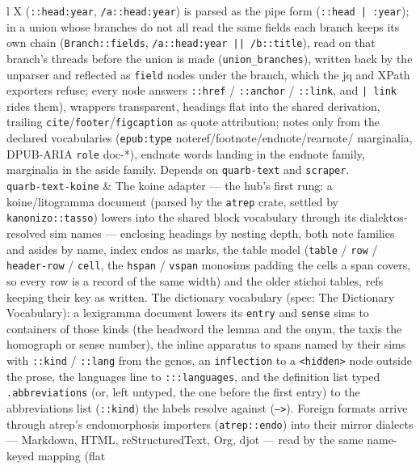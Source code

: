 \documentclass{report}
\begin{document}
\begin{xltabular}{\textwidth}{l X}
  (\texttt{::head:year}, \texttt{/a::head:year}) is parsed as the
  pipe form (\texttt{::head | :year}); in a union whose branches
  do not all read the same fields each branch keeps its own chain
  (\texttt{Branch::fields}, \texttt{/a::head:year || /b::title}),
  read on that branch's threads before the union is made
  (\texttt{union\_branches}), written back by the unparser and
  reflected as \texttt{field} nodes under the branch, which the jq
  and XPath exporters refuse;
  every node answers \texttt{::href} / \texttt{::anchor} /
  \texttt{::link}, and \texttt{| link} rides them),
  wrappers transparent, headings flat into the shared derivation, trailing
  \texttt{cite}/\texttt{footer}/\texttt{figcaption} as quote
  attribution; notes only from the declared vocabularies
  (\texttt{epub:type} noteref/footnote/endnote/rearnote/%
  marginalia, DPUB-ARIA \texttt{role} doc-*), endnote words
  landing in the endnote family, marginalia in the aside
  family. Depends on \texttt{quarb-text} and
  \texttt{scraper}. \\
\texttt{quarb-text-koine} & The koine adapter — the hub's
  first rung: a koine/litogramma document (parsed by the
  \texttt{atrep} crate, settled by \texttt{kanonizo::tasso})
  lowers into the shared block vocabulary through its
  dialektos-resolved sim names — enclosing headings by nesting
  depth, both note families and asides by name, index endos as
  marks, the table model (\texttt{table} / \texttt{row} /
  \texttt{header-row} / \texttt{cell}, the \texttt{hspan} /
  \texttt{vspan} monosims padding the cells a span covers, so
  every row is a record of the same width) and the older
  stichoi tables, refs keeping their key as written. The
  dictionary vocabulary (spec: The Dictionary Vocabulary): a
  lexigramma document lowers its \texttt{entry} and
  \texttt{sense} sims to containers of those kinds (the
  headword the lemma and the onym, the taxis the homograph or
  sense number), the inline apparatus to spans named by their
  sims with \texttt{::kind} / \texttt{::lang} from the genos,
  an \texttt{inflection} to a \texttt{<hidden>} node outside
  the prose, the languages line to \texttt{:::languages}, and
  the definition list typed \texttt{.abbreviations} (or, left
  untyped, the one before the first entry) to the abbreviations
  list (\texttt{::kind}) the labels resolve against
  (\texttt{-->}). Foreign formats arrive through
  atrep's endomorphosis importers (\texttt{atrep::endo}) into
  their mirror dialects — Markdown, HTML, reStructuredText,
  Org, djot — read by the same name-keyed mapping (flat

\end{xltabular}
\end{document}
